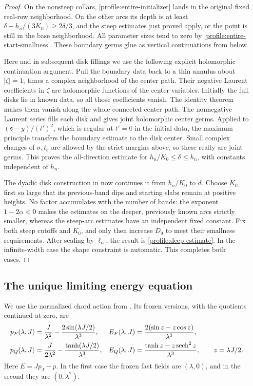 \begin{proof}
On the nonsteep collars, \eqref{profile:entire-initializer} lands in
the original fixed real-row neighborhood. On the other arcs its depth
is at least
\(\delta-h_n/(3K_0)\ge2\delta/3\), and the steep estimates just
proved apply, or the point is still in the base neighborhood.
All parameter sizes tend to zero by
\eqref{profile:entire-start-smallness}. These boundary germs glue as
vertical continuations from below.

Here and in subsequent disk fillings we use the following explicit
holomorphic continuation argument. Pull the boundary data back to a
thin annulus about \(|\zeta|=1\), times a complex neighborhood of
the center path. Their negative Laurent coefficients in \(\zeta\)
are holomorphic functions of the center variables. Initially the full
disks lie in known data, so all those coefficients vanish. The
identity theorem makes them vanish along the whole connected center
path. The nonnegative Laurent series fills each disk and gives joint
holomorphic center germs. Applied to
\((\mathfrak s-y)/(t')^2\), which is regular at \(t'=0\) in the
initial data, the maximum principle transfers the boundary estimate
to the disk center. Small complex changes of \(\sigma,t_c\) are
allowed by the strict margins above, so these really are joint germs.
This proves the all-direction estimate for
\(h_n/K_0\le\delta\le h_n\), with constants independent of
\(h_n\).

The dyadic disk construction in  now continues it from
\(h_n/K_0\) to \(d\). Choose \(K_0\) first so large that its
previous-band dips and starting slabs remain at positive heights.
No factor accumulates with the number of bands: the exponent
\(1-2\alpha<0\) makes the estimates on the deeper, previously known
arcs strictly smaller, whereas the steep-arc estimates have an
independent fixed constant. Fix both steep cutoffs and \(K_0\), and
only then increase \(D_0\) to meet their smallness requirements.
After scaling by \(\ell_n\), the result is
\eqref{profile:deep-estimate}. In the infinite-width case the shape
constraint is automatic. This completes both cases.
\end{proof}

\subsection{The unique limiting energy equation}

We use the normalized chord action from
. Its frozen versions, with the quotients
continued at zero, are
\begin{align}
 \label{profile:frozen-actions}
 p_F(\lambda,J)&=\frac{J}{\lambda^2}
             -\frac{2\sin(\lambda J/2)}{\lambda^3},&
 E_F(\lambda,J)&=
 \frac{2(\sin z-z\cos z)}{\lambda^3},\\
 p_Q(\lambda,J)&=\frac{J}{2\lambda^2}
             -\frac{\tanh(\lambda J/2)}{\lambda^3},&
 E_Q(\lambda,J)&=
 \frac{\tanh z-z\operatorname{sech}^2z}{\lambda^3},
 \qquad z=\lambda J/2.\notag
\end{align}
Here \(E=Jp_J-p\). In the first case the frozen fast fields are
\((\lambda,0)\), and in the second they are \((0,\lambda^2)\).

